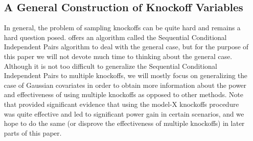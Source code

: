 \subsection{A General Construction of Knockoff Variables}
In general, the problem of sampling knockoffs can be quite hard and remains a hard question posed. \cite{panning} offers an algorithm called the Sequential Conditional Independent Pairs algorithm to deal with the general case, but for the purpose of this paper we will not devote much time to thinking about the general case. Although it is not too difficult to generalize the Sequential Conditional Independent Pairs to multiple knockoffs, we will mostly focus on generalizing the case of Gaussian covariates in order to obtain more information about the power and effectiveness of using multiple knockoffs as opposed to other methods. Note that \cite{panning} provided significant evidence that using the model-X knockoffs procedure was quite effective and led to significant power gain in certain scenarios, and we hope to do the same (or disprove the effectiveness of multiple knockoffs) in later parts of this paper.